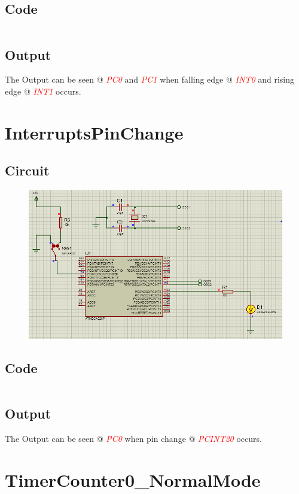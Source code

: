 \documentclass[oneside]{book}
\newcommand{\pinFormat}[1]{\emph{\textcolor{red}{#1}}}
\begin{document}
\subsection{Code}
\inputminted[breaklines,bgcolor=black]{c}{../programFiles/InterruptsExternal.c}
\subsection{Output}
\quad The Output can be seen @ \pinFormat{PC0} and \pinFormat{PC1} when falling edge @ \pinFormat{INT0} and rising edge @ \pinFormat{INT1} occurs.


\section{InterruptsPinChange}
\subsection{Circuit}
\begin{figure}[H]
    \centering
    \includegraphics[height=0.2\textheight]{InterruptsPinChange.png}
\end{figure}
\subsection{Code}
\inputminted[breaklines,bgcolor=black]{c}{../programFiles/InterruptsPinChange.c}
\subsection{Output}
\quad The Output can be seen @ \pinFormat{PC0} when pin change @ \pinFormat{PCINT20} occurs.


\section{TimerCounter0\_NormalMode}
\end{document}
